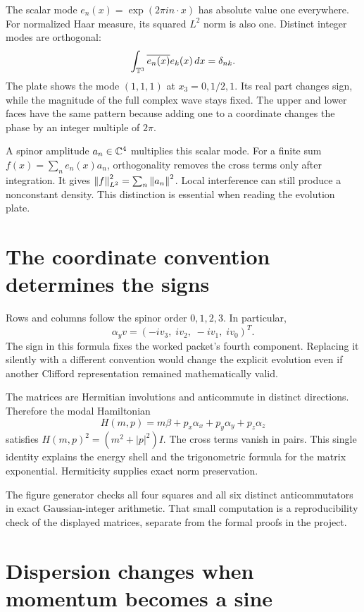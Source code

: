 The scalar mode $e_n(x)=\exp(2\pi i n\cdot x)$ has absolute value one everywhere. For normalized Haar measure, its squared $L^2$ norm is also one. Distinct integer modes are orthogonal:
\[
\int_{\mathbb T^3}\overline{e_n(x)}e_k(x)\,dx=\delta_{nk}.
\]
The plate shows the mode $(1,1,1)$ at $x_3=0,1/2,1$. Its real part changes sign, while the magnitude of the full complex wave stays fixed. The upper and lower faces have the same pattern because adding one to a coordinate changes the phase by an integer multiple of $2\pi$.

A spinor amplitude $a_n\in\mathbb C^4$ multiplies this scalar mode. For a finite sum $f(x)=\sum_n e_n(x)a_n$, orthogonality removes the cross terms only after integration. It gives $\left\lVert f\right\rVert_{L^2}^2=\sum_n\left\lVert a_n\right\rVert^2$. Local interference can still produce a nonconstant density. This distinction is essential when reading the evolution plate.


\clearpage
\section{The coordinate convention determines the signs}

Rows and columns follow the spinor order $0,1,2,3$. In particular,
\[
\alpha_yv=(-iv_3,\;iv_2,\;-iv_1,\;iv_0)^T.
\]
The sign in this formula fixes the worked packet's fourth component. Replacing it silently with a different convention would change the explicit evolution even if another Clifford representation remained mathematically valid.

The matrices are Hermitian involutions and anticommute in distinct directions. Therefore the modal Hamiltonian
\[
H(m,p)=m\beta+p_x\alpha_x+p_y\alpha_y+p_z\alpha_z
\]
satisfies $H(m,p)^2=(m^2+|p|^2)I$. The cross terms vanish in pairs. This single identity explains the energy shell and the trigonometric formula for the matrix exponential. Hermiticity supplies exact norm preservation.

The figure generator checks all four squares and all six distinct anticommutators in exact Gaussian-integer arithmetic. That small computation is a reproducibility check of the displayed matrices, separate from the formal proofs in the project.


\clearpage
\section{Dispersion changes when momentum becomes a sine}

